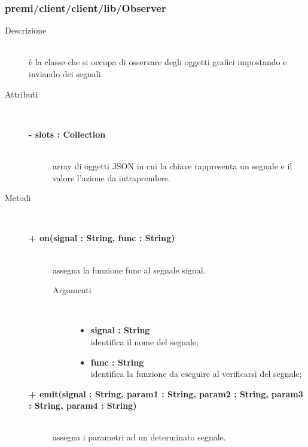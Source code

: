 \subsubsection{premi/client/client/lib/Observer}


\begin{description}
\item[Descrizione] \hfill \\
	è la classe che si occupa di osservare degli oggetti grafici impostando e inviando dei segnali.
		
	
\item[Attributi] \hfill \\
	\begin{description}
		\item[\textbf{- slots : Collection			}] \hfill \\
			array di oggetti JSON in cui la chiave rappresenta un segnale e il valore l'azione da intraprendere.
	\end{description}
	
	
\item[Metodi] \hfill \\

	\begin{description}
		\item[\textbf{\color{blue}+ on(signal : String, func : String)			}] \hfill \\
			assegna la funzione func al segnale signal.
			
		\begin{description}
			\item[Argomenti] \hfill \\
				\begin{itemize}
				
					\item \textbf{signal : String			} \hfill \\
					identifica il nome del segnale;
					\item \textbf{func : String			} \hfill \\
					identifica la funzione da eseguire al verificarsi del segnale;			
				\end{itemize}
		\end{description}
	\end{description}		
	
	\begin{description}
		\item[\textbf{\color{blue}+ emit(signal : String, param1 : String, param2 : String, param3 : String, param4 : String)			}] \hfill \\
			assegna i parametri ad un determinato segnale.
			

\end{description}
\end{description}
